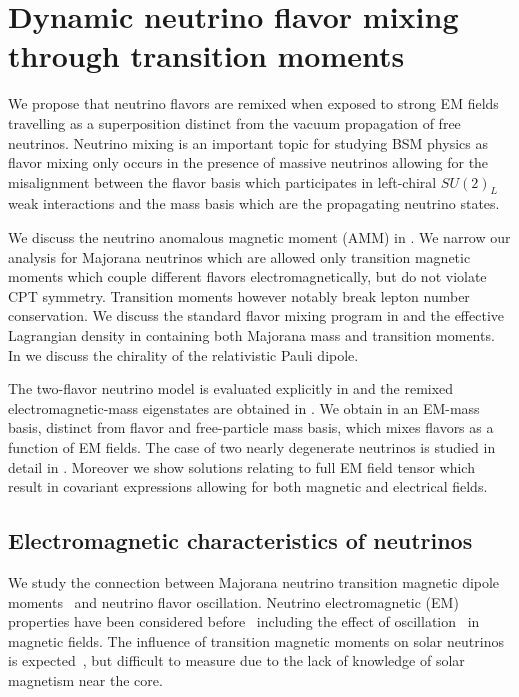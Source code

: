 \chapter{Dynamic neutrino flavor mixing through transition moments}
\label{chap:neutrino}
We propose that neutrino flavors are remixed when exposed to strong EM fields travelling as a superposition distinct from the vacuum propagation of free neutrinos. Neutrino mixing is an important topic for studying BSM physics as flavor mixing only occurs in the presence of massive neutrinos allowing for the misalignment between the flavor basis which participates in left-chiral $SU(2)_{L}$ weak interactions and the mass basis which are the propagating neutrino states.

We discuss the neutrino anomalous magnetic moment (AMM) in . We narrow our analysis for Majorana neutrinos which are allowed only transition magnetic moments which couple different flavors electromagnetically, but do not violate CPT symmetry. Transition moments however notably break lepton number conservation. We discuss the standard flavor mixing program in  and the effective Lagrangian density in  containing both Majorana mass and transition moments. In  we discuss the chirality of the relativistic Pauli dipole.

The two-flavor neutrino model is evaluated explicitly in  and the remixed electromagnetic-mass eigenstates are obtained in . We obtain in  an EM-mass basis, distinct from flavor and free-particle mass basis, which mixes flavors as a function of EM fields. The case of two nearly degenerate neutrinos is studied in detail in . Moreover we show solutions relating to full EM field tensor which result in covariant expressions allowing for both magnetic and electrical fields.

\section{Electromagnetic characteristics of neutrinos}
\label{sec:numoment}
We study the connection between Majorana neutrino transition magnetic dipole moments~\citep{Fujikawa:1980yx,Shrock:1980vy,Shrock:1982sc} and neutrino flavor oscillation. Neutrino electromagnetic (EM) properties have been considered before~\citep{Schechter:1981hw,Giunti:2014ixa,Popov:2019nkr,Chukhnova:2019oum} including the effect of oscillation~\citep{Lim:1987tk,Akhmedov:1988uk,Pal:1991pm,Elizalde:2004mw,Akhmedov:2022txm} in magnetic fields. The influence of transition magnetic moments on solar neutrinos is expected~\citep{Martinez-Mirave:2023fyb}, but difficult to measure due to the lack of knowledge of solar magnetism near the core.

